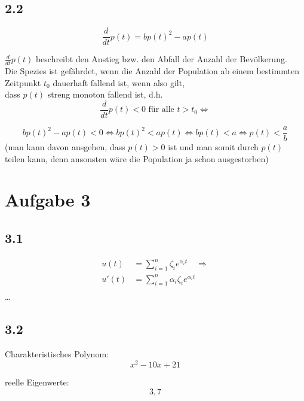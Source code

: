 \documentclass[10pt,oneside,a4paper]{scrartcl}
\begin{document}
	\subsection*{2.2}

	\begin{equation*}
		\frac{d}{dt}p(t) = bp(t)^2- ap(t)
	\end{equation*}

	$ \frac{d}{dt}p(t) $ beschreibt den Anstieg bzw. den Abfall der Anzahl der Bevölkerung.\\
	Die Spezies ist gefährdet, wenn die Anzahl der Population ab einem bestimmten Zeitpunkt $ t_0 $ dauerhaft fallend ist, wenn also gilt,\\
	dass $ p(t) $ streng monoton fallend ist, d.h.
		\begin{equation*}
			\frac{d}{dt}p(t) < 0 \text{ für alle } t>t_0\Leftrightarrow
		\end{equation*}

		\begin{equation*}
			bp(t)^2- ap(t) < 0 \Leftrightarrow bp(t)^2 <  ap(t) \Leftrightarrow bp(t) < a \Leftrightarrow p(t) < \frac{a}{b}
		\end{equation*}
	(man kann davon ausgehen, dass $p(t) > 0$ ist und man somit durch $p(t)$ teilen kann, denn ansonsten wäre die Population ja schon ausgestorben)
		

	\section*{Aufgabe 3}

	\subsection*{3.1}

	\begin{align*}
		u(t) & = \sum\limits_{i=1}^{n} \zeta_{i}e^{\alpha_{i}t} \quad  \Rightarrow \\
		u'(t) & =  \sum\limits_{i=1}^{n} \alpha_{i}\zeta_{i}e^{\alpha_{i}t} \\
	\end{align*}
    \ldots

	\subsection*{3.2}

    Charakteristisches Polynom:
    \[ x^2 - 10x + 21 \]

    reelle Eigenwerte:   
    \[  3 ,  7  \]
\end{document}
